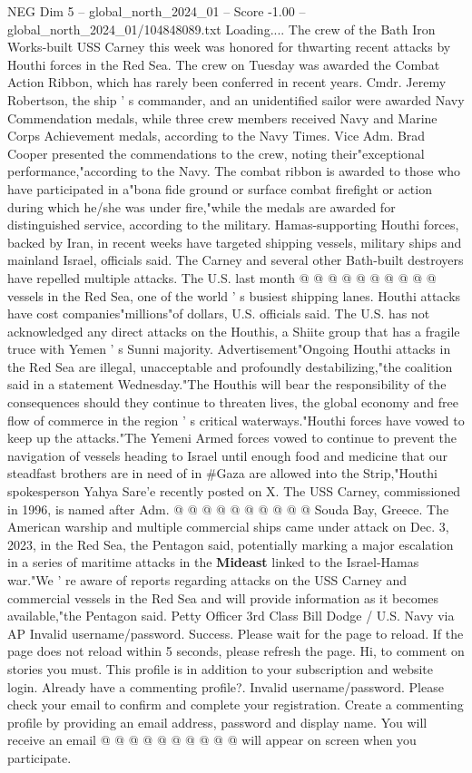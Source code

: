 \begin{textsample}{NEG Dim 5 – global\_north\_2024\_01 – Score -1.00 – global\_north\_2024\_01/104848089.txt}  \label{ex:f5_neg_345}
Loading....
The crew of the Bath Iron Works-built USS Carney this week was honored for thwarting recent attacks by Houthi forces in the Red Sea.
The crew on Tuesday was awarded the Combat Action Ribbon, which has rarely been conferred in recent years.
Cmdr.
Jeremy Robertson, the ship ' s commander, and an unidentified sailor were awarded Navy Commendation medals, while three crew members received Navy and Marine Corps Achievement medals, according to the Navy Times.
Vice Adm.
Brad Cooper presented the commendations to the crew, noting their"exceptional performance,"according to the Navy.
The combat ribbon is awarded to those who have participated in a"bona fide ground or surface combat firefight or action during which he/she was under fire,"while the medals are awarded for distinguished service, according to the military.
Hamas-supporting Houthi forces, backed by Iran, in recent weeks have targeted shipping vessels, military ships and mainland Israel, officials said.
The Carney and several other Bath-built destroyers have repelled multiple attacks.
The U.S. last month @ @ @ @ @ @ @ @ @ @ vessels in the Red Sea, one of the world ' s busiest shipping lanes.
Houthi attacks have cost companies"millions"of dollars, U.S. officials said.
The U.S. has not acknowledged any direct attacks on the Houthis, a Shiite group that has a fragile truce with Yemen ' s Sunni majority.
Advertisement"Ongoing Houthi attacks in the Red Sea are illegal, unacceptable and profoundly destabilizing,"the coalition said in a statement Wednesday."The Houthis will bear the responsibility of the consequences should they continue to threaten lives, the global economy and free flow of commerce in the region ' s critical waterways."Houthi forces have vowed to keep up the attacks."The Yemeni Armed forces vowed to continue to prevent the navigation of vessels heading to Israel until enough food and medicine that our steadfast brothers are in need of in \#Gaza are allowed into the Strip,"Houthi spokesperson Yahya Sare'e recently posted on X.
The USS Carney, commissioned in 1996, is named after Adm. @ @ @ @ @ @ @ @ @ @ Souda Bay, Greece.
The American warship and multiple commercial ships came under attack on Dec. 3, 2023, in the Red Sea, the Pentagon said, potentially marking a major escalation in a series of maritime attacks in the \textbf{Mideast} linked to the Israel-Hamas war."We ' re aware of reports regarding attacks on the USS Carney and commercial vessels in the Red Sea and will provide information as it becomes available,"the Pentagon said.
Petty Officer 3rd Class Bill Dodge / U.S.
Navy via AP Invalid username/password.
Success.
Please wait for the page to reload.
If the page does not reload within 5 seconds, please refresh the page.
Hi, to comment on stories you must.
This profile is in addition to your subscription and website login.
Already have a commenting profile?.
Invalid username/password.
Please check your email to confirm and complete your registration.
Create a commenting profile by providing an email address, password and display name.
You will receive an email @ @ @ @ @ @ @ @ @ @ will appear on screen when you participate.

\end{textsample}
